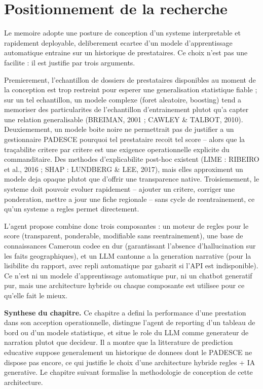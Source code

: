 \documentclass[12pt,a4paper,twoside,openany]{report}
\begin{document}
\section{Positionnement de la recherche}
\label{sec:positionnement}

Le memoire adopte une posture de conception d'un systeme interpretable et rapidement deployable, deliberement ecartee d'un modele d'apprentissage automatique entraine sur un historique de prestataires. Ce choix n'est pas une facilite : il est justifie par trois arguments.

Premierement, l'echantillon de dossiers de prestataires disponibles au moment de la conception est trop restreint pour esperer une generalisation statistique fiable ; sur un tel echantillon, un modele complexe (foret aleatoire, boosting) tend a memoriser des particularites de l'echantillon d'entrainement plutot qu'a capter une relation generalisable (BREIMAN, 2001 ; CAWLEY \& TALBOT, 2010). Deuxiemement, un modele boite noire ne permettrait pas de justifier a un gestionnaire PADESCE pourquoi tel prestataire recoit tel score -- alors que la traçabilite critere par critere est une exigence operationnelle explicite du commanditaire. Des methodes d'explicabilite post-hoc existent (LIME : RIBEIRO et al., 2016 ; SHAP : LUNDBERG \& LEE, 2017), mais elles approxi\-ment un modele deja opaque plutot que d'offrir une transparence native. Troisiemement, le systeme doit pouvoir evoluer rapidement -- ajouter un critere, corriger une ponderation, mettre a jour une fiche regionale -- sans cycle de reentrainement, ce qu'un systeme a regles permet directement.

L'agent propose combine donc trois composantes : un moteur de regles pour le score (transparent, ponderable, modifiable sans reentrainement), une base de connaissances Cameroun codee en dur (garantissant l'absence d'hallucination sur les faits geographiques), et un LLM cantonne a la generation narrative (pour la lisibilite du rapport, avec repli automatique par gabarit si l'API est indisponible). Ce n'est ni un modele d'apprentissage automatique pur, ni un chatbot generatif pur, mais une architecture hybride ou chaque composante est utilisee pour ce qu'elle fait le mieux.

\textbf{Synthese du chapitre.} Ce chapitre a defini la performance d'une prestation dans son acception operationnelle, distingue l'agent de reporting d'un tableau de bord ou d'un modele statistique, et situe le role du LLM comme generateur de narration plutot que decideur. Il a montre que la litterature de prediction educative suppose generalement un historique de donnees dont le PADESCE ne dispose pas encore, ce qui justifie le choix d'une architecture hybride regles + IA generative. Le chapitre suivant formalise la methodologie de conception de cette architecture.
\end{document}
